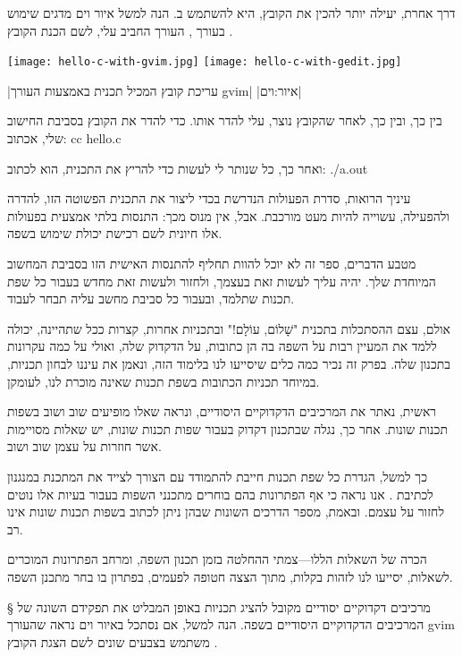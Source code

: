 דרך אחרת, יעילה יותר להכין את הקובץ, היא להשתמש ב. הנה למשל \cf איור וים
מדגים שימוש בעורך , העורך החביב עלי, לשם הכנת הקובץ .

\begin{איור}[!htbp]
\begin{center}
\texttt{[image: hello-c-with-gvim.jpg]}
\texttt{[image: hello-c-with-gedit.jpg]}
\end{center}
|עריכת קובץ המכיל תכנית  באמצעות העורך gvim|
|איור:וים|
\end{איור}



בין כך, ובין כך, לאחר שהקובץ נוצר, עלי להדר אותו. כדי להדר את הקובץ בסביבת
החישוב שלי, אכתוב:
\bash[script]
cc hello.c
\END

ואחר כך, כל שנותר לי לעשות כדי להריץ את התכנית, הוא לכתוב:
./a.out
\END

עיניך הרואות, סדרת הפעולות הנדרשת בכדי ליצור את התכנית הפשוטה הזו, להדרה
ולהפעילה, עשוייה להיות מעט מורכבת. אבל, אין מנוס מכך: התנסות בלתי אמצעית
בפעולות אלו חיונית לשם רכישת יכולת שימוש בשפה.

מטבע הדברים, ספר זה לא יוכל להוות תחליף להתנסות האישית הזו בסביבת המחשוב
המיוחדת שלך. יהיה עליך לעשות זאת בעצמך, ולחזור ולעשות זאת מחדש בעבור כל שפת
תכנות שתלמד, ובעבור כל סביבת מחשב עליה תבחר לעבוד.

אולם, עצם ההסתכלות בתכנית "שָׁלוֹם, עוֹלָם!" ובתכניות אחרות, קצרות ככל שתהיינה,
יכולה ללמד את המעיין רבות על השפה בה הן כתובות, על הדקדוק שלה, ואולי על כמה
עקרונות בתכנון שלה. בפרק זה נכיר כמה כלים שיסייעו לנו בלימוד הזה, ונאמן את
עיננו לבחון תכניות, במיוחד תכניות הכתובות בשפת תכנות שאינה מוכרת לנו, לעומקן.

ראשית, נאתר את המרכיבים הדקדוקיים היסודיים, ונראה שאלו מופיעים שוב ושוב בשפות
תכנות שונות. אחר כך, נגלה שבתכנון דקדוק בעבור שפות תכנות שונות, יש שאלות
מסויימות אשר חוזרות על עצמן שוב ושוב.

כך למשל, הגדרת כל שפת תכנות חייבת להתמודד עם הצורך לצייד את המתכנת במנגנון
לכתיבת . אנו נראה כי אף הפתרונות בהם בוחרים מתכנני השפות בעבור בעיות אלו
נוטים לחזור על עצמם. ובאמת, מספר הדרכים השונות שבהן ניתן לכתוב  בשפות
תכנות שונות אינו רב.

הכרה של השאלות הללו---צמתי ההחלטה בזמן תכנון השפה, ומרחב הפתרונות המוכרים
לשאלות, יסייעו לנו לזהות בקלות, מתוך הצצה חטופה לפעמים, בפתרון בו בחר מתכנן
השפה.

§ מרכיבים דקדוקיים יסודיים
מקובל להציג תכניות באופן המבליט את תפקידם השונה של המרכיבים הדקדוקיים היסודיים
בשפה. הנה למשל, אם נסתכל ב איור וים נראה שהעורך gvim משתמש בצבעים שונים לשם
הצגת הקובץ .

